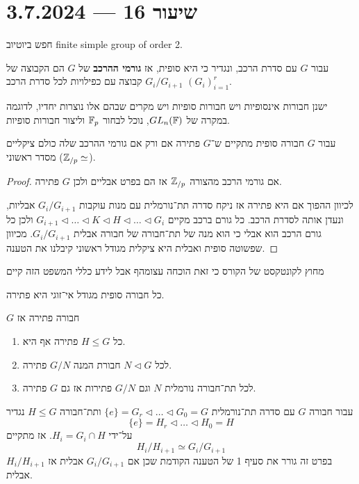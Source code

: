 \section{שיעור 16 --- 3.7.2024}
חפש ביוטיוב finite simple group of order 2.
\begin{definition}
	עבור $G$ עם סדרת הרכב, ונגדיר כי היא סופית,
	אז \textbf{גורמי ההרכב} של $G$ הם הקבוצה של $G_i / G_{i + 1}$ קבוצה עם כפילויות לכל סדרת הרכב ${(G_i)}_{i = 1}^r$.
\end{definition}
ישנן חבורות אינסופיות ויש חבורות סופיות ויש מקרים שבהם אלו נוצרות יחדיו, לדוגמה במקרה של $GL_n(\mathbb{F})$, נוכל לבחור $\mathbb{F}_p$ וליצור חבורות סופיות.
\begin{proposition}
	עבור $G$ חבורה סופית מתקיים ש־$G$ פתירה אם ורק אם גורמי ההרכב שלה כולם ציקליים מסדר ראשוני ($\mathbb{Z}_{/p} \simeq$).
\end{proposition}
\begin{proof}
	אם גורמי הרכב מהצורה $\mathbb{Z}_{/p}$ אז הם בפרט אבליים ולכן $G$ פתירה.

	לכיוון ההפוך אם היא פתירה אז ניקח סדרה תת־נורמלית עם מנות עוקבות $G_i / G_{i + 1}$ אבליות, ונעדן אותה לסדרת הרכב.
	כל גורם ברכב מקיים $G_{i + 1} \triangleleft \dots \triangleleft K \triangleleft H \triangleleft \dots \triangleleft G_i$ ולכן כל גורם הרכב הוא אבלי כי הוא מנה של תת־חבורה של חבורה אבלית $G_i / G_{i + 1}$.
	מכיוון שפשוטה סופית ואבלית היא ציקלית מגודל ראשוני קיבלנו את הטענה.
\end{proof}
מחוץ לקונטקסט של הקורס כי זאת הוכחה עצומהף אבל לידע כללי המשפט הזה קיים
\begin{theorem}
	כל חבורה סופית מגודל אי־זוגי היא פתירה.
\end{theorem}
\begin{proposition}
	$G$ חבורה פתירה אז
	\begin{enumerate}
		\item כל $H \le G$ פתירה אף היא.
		\item לכל $N \triangleleft G$ חבורת המנה $G/N$ פתירה.
		\item לכל תת־חבורה נורמלית $N$ וגם $G/N$ פתירות אז גם $G$ פתירה.
	\end{enumerate}
\end{proposition}
\begin{lemma}
	עבור חבורה $G$ עם סדרה תת־נורמלית $\{e\} = G_r \triangleleft \dots \triangleleft G_0 = G$ ותת־חבורה $H \le G$ נגדיר
	\[
		\{e\} = H_r \triangleleft \dots \triangleleft H_0 = H
	\]
	על־ידי $H_i = G_i \cap H$. אז מתקיים
	\[
		H_i / H_{i + 1} \simeq G_i / G_{i + 1}
	\]
	בפרט זה גורר את סעיף 1 של הטענה הקודמת שכן אם $G_i / G_{i + 1}$ אבלית אז $H_i / H_{i + 1}$ אבלית.
\end{lemma}
